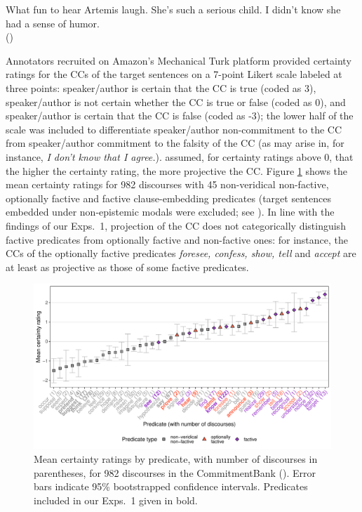 \documentclass[11pt,fleqn]{article}
\newcommand{\6}{\mbox{$[\hspace*{-.6mm}[$}}
\newcommand{\9}{\mbox{$]\hspace*{-.6mm}]$}}
\begin{document}
\begin{exe}
\ex\label{cb} What fun to hear Artemis laugh. She's such a serious child. I didn't know she had a sense of humor. \\ \hspace*{.2cm} \hfill (\citealt[109]{demarneffe-etal-sub23})
\end{exe}
Annotators recruited on Amazon's Mechanical Turk platform provided certainty ratings for the CCs of the target sentences on a 7-point Likert scale labeled at three points: speaker/author is certain that the CC is true (coded as 3), speaker/author is not certain whether the CC is true or false (coded as 0), and speaker/author is certain that the CC is false (coded as -3); the lower half of the scale was included to differentiate speaker/author non-commitment to the CC from speaker/author commitment to the falsity of the CC (as may arise in, for instance, {\em I don't know that I agree.}). \citet{demarneffe-etal-sub23} assumed, for certainty ratings above 0, that the higher the certainty rating, the more projective the CC. Figure \ref{f-commitmentbank} shows the mean certainty ratings for 982 discourses with 45 non-veridical non-factive, optionally factive and factive clause-embedding predicates (target sentences embedded under non-epistemic modals were excluded; see \citealt[\S3]{demarneffe-etal-sub23}). In line with the findings of our Exps.~1, projection of the CC does not categorically distinguish factive predicates from optionally factive and non-factive ones: for instance, the CCs of the optionally factive predicates {\em foresee, confess, show, tell} and {\em accept} are at least as projective as those of some factive predicates. 

\begin{figure}[H]
\centering
\includegraphics[width=.75\paperwidth]{../../CommitmentBank-analysis/graphs/means-projectivity-by-predicate-variability}

\caption{Mean certainty ratings by predicate, with number of discourses in parentheses, for 982 discourses in the CommitmentBank (\citealt*{demarneffe-etal-sub23}). Error bars indicate 95\% bootstrapped confidence intervals. Predicates included in our Exps.~1 given in bold.}
\label{f-commitmentbank}
\end{figure}
\end{document}
